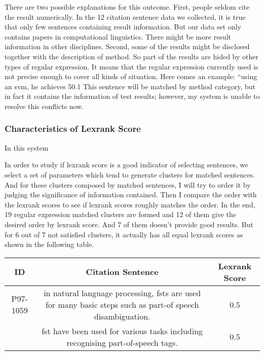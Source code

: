 \documentclass[hyp]{socreport}
\begin{document}
There are two possible explanations for this outcome. First, people seldom cite the result numerically. In the 12 citation sentence data we collected, it is true that only few sentences containing result information. But our data set only contains papers in computational linguistics. There might be more result information in other disciplines. Second, some of the results might be disclosed together with the description of method. So part of the results are hided by other types of regular expression. It means that the regular expression currently used is not precise enough to cover all kinds of situation. Here comes an example:
“using an svm, he achieves 50.1%
This sentence will be matched by method category, but in fact it contains the information of test results; however, my system is unable to resolve this conflicts now. 



\subsubsection{Characteristics of Lexrank Score}
In this system

In order to study if lexrank score is a good indicator of selecting sentences, we select a set of parameters which tend to generate clusters for matched sentences. And for these clusters composed by matched sentences, I will try to order it by judging the significance of information contained. Then I compare the order with the lexrank scores to see if lexrank scores roughly matches the order. In the end, 19 regular expression matched clusters are formed and 12 of them give the desired order by lexrank score. And 7 of them doesn’t provide good results. But for 6 out of 7 not satisfied clusters, it actually has all equal lexrank scores as shown in the following table.


\begin{tabular}[t]{c|c|c}
\hline
ID & Citation Sentence & Lexrank Score \\
\hline
P97-1059 & in natural language processing, fsts are used for many basic steps such as part-of speech disambiguation.  &  0.5 \\
& fst have been used for various tasks including recognising part-of-speech tags.  &  0.5 \\
\hline
\end{tabular} 
\end{document}
